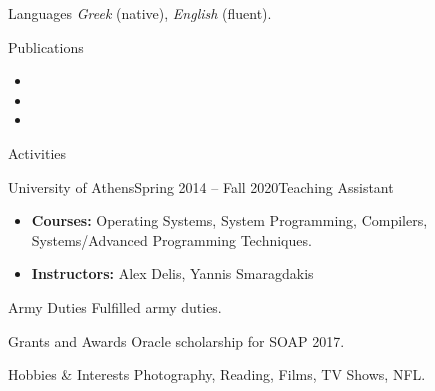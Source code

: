 \documentclass{resume}
\begin{document}
\begin{rSection}{Languages}
  \textit{Greek} (native), \textit{English} (fluent).
\end{rSection}

\begin{rSection}{Publications}
    \begin{itemize}[label={}, leftmargin=*, topsep=0.1pt]
      \setlength\itemsep{+0.5em}
        \item {}
        \item {}
        \item {}
    \end{itemize}
\end{rSection}

\begin{rSection}{Activities}
  \begin{rSubsection}{University of Athens}{Spring 2014 -- Fall 2020}{Teaching Assistant}{}
    \begin{itemize}[label={-}]
      \setlength\itemsep{-0.5em}
        \item {\bf Courses:}  Operating Systems, System Programming, Compilers, Systems/Advanced Programming Techniques.
        \item {\bf Instructors:} Alex Delis, Yannis Smaragdakis
      \end{itemize}
    \end{rSubsection}
\end{rSection}


\begin{rSection}{Army Duties}
Fulfilled army duties.
\end{rSection}

\begin{rSection}{Grants and Awards}
  Oracle scholarship for SOAP 2017.
\end{rSection}


\begin{rSection}{Hobbies \& Interests}
  Photography, Reading, Films, TV Shows, NFL.
\end{rSection}
\end{document}
